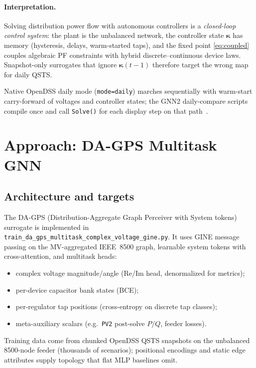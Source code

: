 \documentclass[11pt,a4paper]{article}
\begin{document}
\paragraph{Interpretation.}
Solving distribution power flow with autonomous controllers is a \emph{closed-loop
control system}: the plant is the unbalanced network, the controller state
$\boldsymbol{\kappa}$ has memory (hysteresis, delays, warm-started taps), and the
fixed point \eqref{eq:coupled} couples algebraic PF constraints with hybrid
discrete--continuous device laws.  Snapshot-only surrogates that ignore
$\boldsymbol{\kappa}(t{-}1)$ therefore target the wrong map for daily QSTS.

Native OpenDSS daily mode (\texttt{mode=daily}) marches sequentially with
warm-start carry-forward of voltages and controller states; the GNN2 daily-compare
scripts compile once and call \texttt{Solve()} for each display step on that
path~\cite{opendss}.

\section{Approach: DA-GPS Multitask GNN}
\label{sec:approach}

\subsection{Architecture and targets}

The DA-GPS (Distribution-Aggregate Graph Perceiver with System tokens) surrogate
is implemented in \texttt{train\_da\_gps\_multitask\_complex\_voltage\_gine.py}.
It uses GINE message passing on the MV-aggregated IEEE~8500 graph, learnable
system tokens with cross-attention, and multitask heads:
\begin{itemize}
  \item complex voltage magnitude/angle (Re/Im head, denormalized for metrics);
  \item per-device capacitor bank states (BCE);
  \item per-regulator tap positions (cross-entropy on discrete tap classes);
  \item meta-auxiliary scalars (e.g.\ \texttt{PV2} post-solve $P/Q$, feeder
        losses).
\end{itemize}
Training data come from chunked OpenDSS QSTS snapshots on the unbalanced
8500-node feeder (thousands of scenarios); positional encodings and static edge
attributes supply topology that flat MLP baselines omit.
\end{document}

